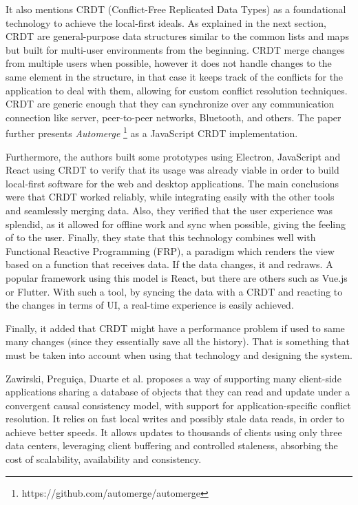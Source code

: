 It also mentions CRDT (Conflict-Free Replicated Data Types) as a foundational technology to achieve the local-first ideals. As explained in the next section,  CRDT are general-purpose data structures similar to the common lists and maps but built for multi-user environments from the beginning. CRDT merge changes from multiple users when possible, however it does not handle changes to the same element in the structure, in that case it keeps track of the conflicts for the application to deal with them, allowing for custom conflict resolution techniques. CRDT are generic enough that they can synchronize over any communication connection like server, peer-to-peer networks, Bluetooth, and others. The paper further presents \textit{Automerge} \footnote{https://github.com/automerge/automerge} as a JavaScript CRDT implementation.

Furthermore, the authors built some prototypes using Electron, JavaScript and React using CRDT to verify that its usage was already viable in order to build local-first software for the web and desktop applications. The main conclusions were that CRDT worked reliably, while integrating easily with the other tools and seamlessly merging data. Also, they verified that the user experience was splendid, as it allowed for offline work and sync when possible, giving the feeling of  to the user. Finally, they state that this technology combines well with Functional Reactive Programming (FRP), a paradigm which renders the view based on a function that receives data. If the data changes, it  and redraws. A popular framework using this model is React, but there are others such as Vue.js or Flutter. With such a tool, by syncing the data with a CRDT and reacting to the changes in terms of UI, a real-time experience is easily achieved.

Finally, it added that CRDT might have a performance problem if used to same many changes (since they essentially save all the history). That is something that must be taken into account when using that technology and designing the system.

Zawirski, Preguiça, Duarte et al. \cite{Zawirski2015} proposes a way of supporting many client-side applications sharing a database of objects that they can read and update under a convergent causal consistency model, with support for application-specific conflict resolution. It relies on fast local writes and possibly stale data reads, in order to achieve better speeds. It allows updates to thousands of clients using only three data centers, leveraging client buffering and controlled staleness, absorbing the cost of scalability, availability and consistency.

